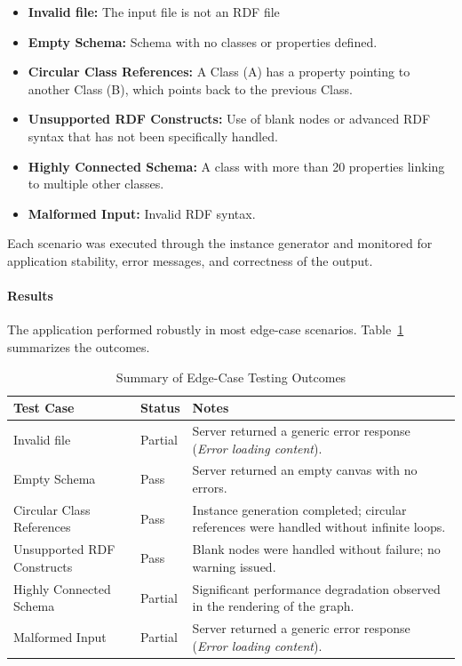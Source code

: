 \begin{itemize}
    \item \textbf{Invalid file:} The input file is not an RDF file
    \item \textbf{Empty Schema:} Schema with no classes or properties defined.
    \item \textbf{Circular Class References:} A Class (A) has a property pointing to another Class (B), which points back to the previous Class.
    \item \textbf{Unsupported RDF Constructs:} Use of blank nodes or advanced RDF syntax that has not been specifically handled.
    \item \textbf{Highly Connected Schema:} A class with more than 20 properties linking to multiple other classes.
    \item \textbf{Malformed Input:} Invalid RDF syntax.
\end{itemize}

Each scenario was executed through the instance generator and monitored for application stability, error messages, and correctness of the output.

\paragraph{Results}
The application performed robustly in most edge-case scenarios. Table~\ref{tab:edge-case-results} summarizes the outcomes.

\begin{table}[H]
\centering
\begin{tabular}{|p{4.5cm}|p{3cm}|p{6cm}|}
\hline

\textbf{Test Case} & \textbf{Status} & \textbf{Notes} \\ \hline 
Invalid file & Partial & Server returned a generic error response (\textit{Error loading content}). \\ \hline
Empty Schema & Pass & Server returned an empty canvas with no errors. \\ \hline
Circular Class References & Pass & Instance generation completed; circular references were handled without infinite loops. \\ \hline
Unsupported RDF Constructs & Pass & Blank nodes were handled without failure; no warning issued. \\ \hline
Highly Connected Schema & Partial & Significant performance degradation observed in the rendering of the graph. \\ \hline
Malformed Input & Partial & Server returned a generic error response (\textit{Error loading content}). \\ \hline
\end{tabular}
\caption{Summary of Edge-Case Testing Outcomes}
\label{tab:edge-case-results}
\end{table}

